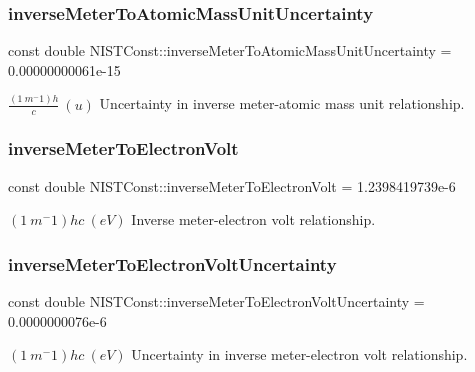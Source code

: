 \subsubsection{\texorpdfstring{inverse\+Meter\+To\+Atomic\+Mass\+Unit\+Uncertainty}{inverseMeterToAtomicMassUnitUncertainty}}
{\footnotesize\ttfamily const double N\+I\+S\+T\+Const\+::inverse\+Meter\+To\+Atomic\+Mass\+Unit\+Uncertainty = 0.\+00000000061e-\/15}

$\frac{(1\ m^-1)h}{c} \ (u)$ Uncertainty in inverse meter-\/atomic mass unit relationship. \mbox{\label{group___inverse_meter_gafdede27a7699d3a180bb829b65fac447}} 
\subsubsection{\texorpdfstring{inverse\+Meter\+To\+Electron\+Volt}{inverseMeterToElectronVolt}}
{\footnotesize\ttfamily const double N\+I\+S\+T\+Const\+::inverse\+Meter\+To\+Electron\+Volt = 1.\+2398419739e-\/6}

$(1\ m^-1)hc \ (eV)$ Inverse meter-\/electron volt relationship. \mbox{\label{group___inverse_meter_gaffb7462545a03fb13544c9f65d77dc7e}} 
\subsubsection{\texorpdfstring{inverse\+Meter\+To\+Electron\+Volt\+Uncertainty}{inverseMeterToElectronVoltUncertainty}}
{\footnotesize\ttfamily const double N\+I\+S\+T\+Const\+::inverse\+Meter\+To\+Electron\+Volt\+Uncertainty = 0.\+0000000076e-\/6}

$(1\ m^-1)hc \ (eV)$ Uncertainty in inverse meter-\/electron volt relationship. \mbox{\label{group___inverse_meter_ga6f47bdfe8997031b0f15229eb5bf4b9e}} 
